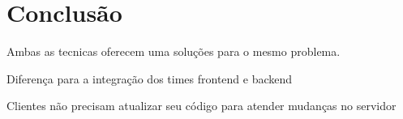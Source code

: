 \chapter{Conclusão}

Ambas as tecnicas oferecem uma soluções para o mesmo problema.

Diferença para a integração dos times frontend e backend

Clientes não precisam atualizar seu código para atender mudanças no servidor

\lipsum[31-33]
